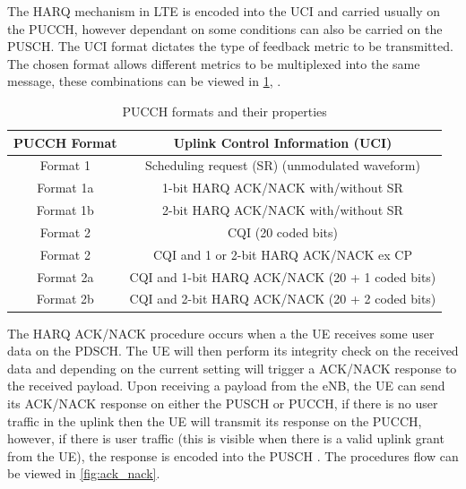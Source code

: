 \documentclass{article}
\begin{document}
The HARQ mechanism in LTE is encoded into the UCI and carried usually on the PUCCH, however dependant on some conditions can also be carried on the PUSCH. The UCI format dictates the type of feedback metric to be transmitted. The chosen format allows different metrics to be multiplexed into the same message, these combinations can be viewed in \cref{tab:pucch_formats}, \cite[Section 17.3.1.2]{umts_sesia}. 

\begin{table}[h]
\centering
\begin{tabular}{||c| c||} 
\hline
PUCCH Format & Uplink Control Information (UCI) \\ [0.1ex] 
\hline\hline
Format 1 & Scheduling request (SR) (unmodulated waveform)\\ 
\hline
Format 1a & 1-bit HARQ ACK/NACK with/without SR\\
\hline
Format 1b & 2-bit HARQ ACK/NACK with/without SR\\
\hline
Format 2 &  CQI (20 coded bits)\\
\hline
Format 2 & CQI and 1 or 2-bit HARQ ACK/NACK ex CP\\
\hline
Format 2a & CQI and 1-bit HARQ ACK/NACK (20 + 1 coded bits)\\
\hline
Format 2b & CQI and 2-bit HARQ ACK/NACK (20 + 2 coded bits)\\
\hline
\end{tabular}
\caption{PUCCH formats and their properties}
\label{tab:pucch_formats}
\end{table}


The HARQ ACK/NACK procedure occurs when a the UE receives some user data on the PDSCH. The UE will then perform its integrity check on the received data and depending on the current setting will trigger a ACK/NACK response to the received payload. Upon receiving a payload from the eNB, the UE can send its ACK/NACK response on either the PUSCH or PUCCH, if there is no user traffic in the uplink then the UE will transmit its response on the PUCCH, however, if there is user traffic (this is visible when there is a valid uplink grant from the UE), the response is encoded into the PUSCH \cite[Section 11.4]{lte_advaned_mobile}. The procedures flow can be viewed in \cref{fig:ack_nack}. 
\end{document}
